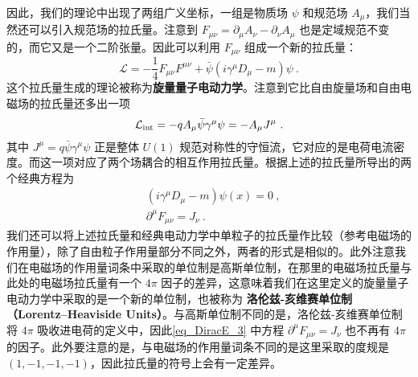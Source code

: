 因此，我们的理论中出现了两组广义坐标，一组是物质场 $\psi$ 和规范场 $A_\mu$，我们当然还可以引入规范场的拉氏量。注意到 $F_{\mu\nu} = \partial_\mu A_\nu - \partial_\nu A_\mu$ 也是定域规范不变的，而它又是一个二阶张量。因此可以利用 $F_{\mu\nu}$ 组成一个新的拉氏量：
\begin{equation}
\mathcal{L}=-\frac{1}{4}F_{\mu\nu}F^{\mu\nu} + \bar\psi (i\gamma^\mu D_\mu - m)\psi~.
\end{equation}
这个拉氏量生成的理论被称为\textbf{旋量量子电动力学}。注意到它比自由旋量场和自由电磁场的拉氏量还多出一项
\begin{equation}
\mathcal{L}_{\rm int}=-q A_\mu \bar\psi \gamma^\mu \psi=-A_\mu J^\mu~.
\end{equation}
其中 $J^\mu = q\bar\psi \gamma^\mu \psi$ 正是整体 $U(1)$ 规范对称性的守恒流，它对应的是电荷电流密度。而这一项对应了两个场耦合的相互作用拉氏量。根据上述的拉氏量所导出的两个经典方程为
\begin{equation}\label{eq_DiracE_3}
\begin{aligned}
&(i\gamma^\mu D_\mu - m)\psi(x)=0~,\\
&\partial^\mu F_{\mu\nu}=J_\nu~.
\end{aligned}
\end{equation}
我们还可以将上述拉氏量和经典电动力学中单粒子的拉氏量作比较（参考电磁场的作用量），除了自由粒子作用量部分不同之外，两者的形式是相似的。此外注意我们在电磁场的作用量词条中采取的单位制是高斯单位制，在那里的电磁场拉氏量与此处的电磁场拉氏量有一个 $4\pi$ 因子的差异，这意味着我们在这里定义的旋量量子电动力学中采取的是一个新的单位制，也被称为 \textbf{洛伦兹-亥维赛单位制 （Lorentz–Heaviside Units）}。与高斯单位制不同的是，洛伦兹-亥维赛单位制将 $4\pi$ 吸收进电荷的定义中，因此\autoref{eq_DiracE_3} 中方程 $\partial^\mu F_{\mu\nu}=J_\nu$ 也不再有 $4\pi$ 的因子。此外要注意的是，与电磁场的作用量词条不同的是这里采取的度规是 $(1,-1,-1,-1)$，因此拉氏量的符号上会有一定差异。
